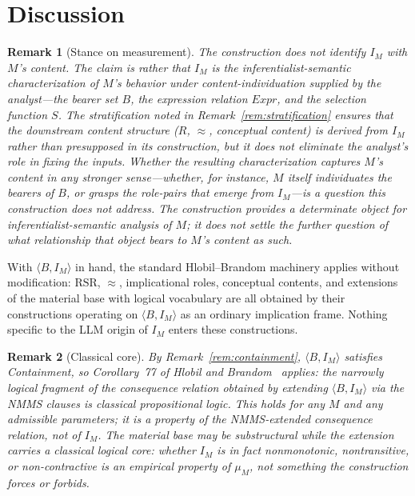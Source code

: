 \documentclass[11pt]{article}
\newtheorem{remark}{Remark}
\begin{document}
\section{Discussion}
\label{sec:discussion}

\begin{remark}[Stance on measurement]
The construction does not identify $I_M$ with $M$'s content. The claim is rather that $I_M$ is the inferentialist-semantic characterization of $M$'s behavior under content-individuation supplied by the analyst---the bearer set $B$, the expression relation $\mathit{Expr}$, and the selection function $S$. The stratification noted in Remark~\ref{rem:stratification} ensures that the downstream content structure ($R$, $\approx$, conceptual content) is derived from $I_M$ rather than presupposed in its construction, but it does not eliminate the analyst's role in fixing the inputs. Whether the resulting characterization captures $M$'s content in any stronger sense---whether, for instance, $M$ itself individuates the bearers of $B$, or grasps the role-pairs that emerge from $I_M$---is a question this construction does not address. The construction provides a determinate object for inferentialist-semantic analysis of $M$; it does not settle the further question of what relationship that object bears to $M$'s content as such.
\end{remark}

With $\langle B, I_M \rangle$ in hand, the standard Hlobil--Brandom machinery applies without modification: $\mathrm{RSR}$, $\approx$, implicational roles, conceptual contents, and extensions of the material base with logical vocabulary are all obtained by their constructions operating on $\langle B, I_M \rangle$ as an ordinary implication frame. Nothing specific to the LLM origin of $I_M$ enters these constructions.

\begin{remark}[Classical core]
By Remark~\ref{rem:containment}, $\langle B, I_M \rangle$ satisfies Containment, so Corollary~77 of Hlobil and Brandom~\cite{hlobil2025} applies: the narrowly logical fragment of the consequence relation obtained by extending $\langle B, I_M \rangle$ via the NMMS clauses is classical propositional logic. This holds for any $M$ and any admissible parameters; it is a property of the NMMS-extended consequence relation, not of $I_M$. The material base may be substructural while the extension carries a classical logical core: whether $I_M$ is in fact nonmonotonic, nontransitive, or non-contractive is an empirical property of $\mu_M$, not something the construction forces or forbids.
\end{remark}
\end{document}
